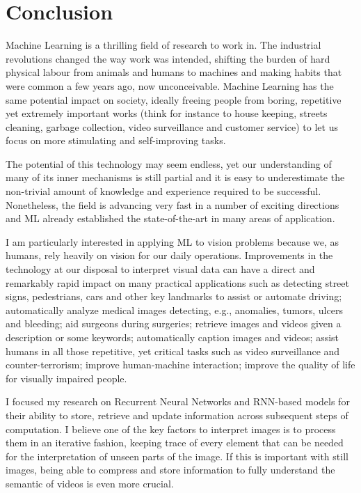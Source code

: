 \chapter{Conclusion}\label{sec:conclusion}

Machine Learning is a thrilling field of research to work in. The industrial
revolutions changed the way work was intended, shifting the burden of hard
physical labour from animals and humans to machines and making habits that were
common a few years ago, now unconceivable. Machine Learning has the same
potential impact on society, ideally freeing people from boring, repetitive
yet extremely important works (think for instance to house keeping, streets
cleaning, garbage collection, video surveillance and customer service) to let
us focus on more stimulating and self-improving tasks.

The potential of this technology may seem endless, yet our
understanding of many of its inner mechanisms is still partial and it is easy
to underestimate the non-trivial amount of knowledge and experience required to
be successful.  Nonetheless, the field is advancing very fast in a number of
exciting directions and ML already established the state-of-the-art in many
areas of application.

I am particularly interested in applying ML to vision problems because we, as
humans, rely heavily on vision for our daily operations. Improvements in the
technology at our disposal to interpret visual data can have a direct and
remarkably rapid impact on many practical applications such as detecting
street signs, pedestrians, cars and other key landmarks to assist or automate
driving; automatically analyze medical images detecting, e.g., anomalies,
tumors, ulcers and bleeding; aid surgeons during surgeries; retrieve images and
videos given a description or some keywords; automatically caption images and
videos; assist humans in all those repetitive, yet critical tasks such as video
surveillance and counter-terrorism; improve human-machine interaction; improve
the quality of life for visually impaired people.

I focused my research on Recurrent Neural Networks and RNN-based models for
their ability to store, retrieve and update information across subsequent steps
of computation. I believe one of the key factors to interpret images is to
process them in an iterative fashion, keeping trace of every element that can
be needed for the interpretation of unseen parts of the image. If this is
important with still images, being able to compress and store information to
fully understand the semantic of videos is even more crucial.

